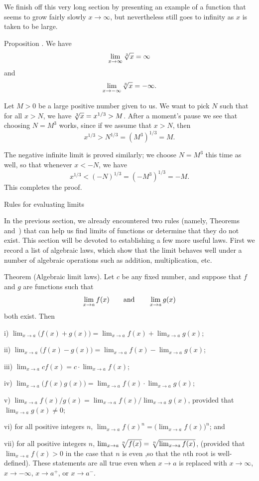 We finish off this very long section by presenting
an example of a function that seems to grow fairly slowly $x\to\infty$, but nevertheless still goes to
infinity as $x$ is taken to be large.

\proclaim Proposition \advthm. We have
$$\lim_{x\to\infty} \root 3\of x = \infty$$
and
$$\lim_{x\to-\infty} \root 3\of x = -\infty.$$

\proof Let $M>0$ be a large positive number given to us.
We want to pick $N$ such that for all $x>N$, we have $\root 3\of x = x^{1/3} > M$.
After a moment's pause we see that choosing $N = M^3$ works, since if we assume that $x>N$, then
$$x^{1/3} > N^{1/3} = (M^3)^{1/3} = M.$$

The negative infinite limit is proved similarly; we choose $N = M^3$ this time as well, so that
whenever $x<-N$, we have
$$x^{1/3} < (-N)^{1/3} = (-M^3)^{1/3} = -M.$$
This completes the proof.\slug

\advsect Rules for evaluating limits

In the previous section, we already encountered two rules (namely, Theorems~{\thmonesidedsame}
and~{\thmonesideddiff}) that can help us find limits of functions
or determine that they do not exist. This section will be devoted to establishing a few more useful laws.
First we record a list of algebraic laws, which show that the limit behaves well under a number of algebraic
operations such as addition, multiplication, etc.

\edef\thmalglaws{\the\thmcount}
\parenproclaim Theorem {\advthm} (Algebraic limit laws).
Let $c$ be any fixed number, and suppose that $f$ and $g$ are functions such that
$$\lim_{x\to a} f(x)\qquad\hbox{and}\qquad \lim_{x\to a} g(x)$$
both exist. Then
\medskip
\item{i)} $\lim_{x\to a} \bigl( f(x) + g(x)\bigr) = \lim_{x\to a} f(x) + \lim_{x\to a} g(x)$;
\smallskip
\item{ii)} $\lim_{x\to a} \bigl( f(x) - g(x)\bigr) = \lim_{x\to a} f(x) - \lim_{x\to a} g(x)$;
\smallskip
\item{iii)} $\lim_{x\to a} cf(x) = c\cdot \lim_{x\to a} f(x)$;
\smallskip
\item{iv)} $\lim_{x\to a} \bigl( f(x)g(x)\bigr) = \lim_{x\to a} f(x) \cdot \lim_{x\to a} g(x)$;
\smallskip
\item{v)} $\lim_{x\to a} f(x)/g(x) = \lim_{x\to a} f(x) \bigl/ \lim_{x\to a} g(x)$, provided
that $\lim_{x\to a} g(x)\ne 0$;
\smallskip
\item{vi)} for all positive integers $n$, $\lim_{x\to a} f(x)^n = \bigl(\lim_{x\to a} f(x)\bigr)^n$; and
\smallskip
\item{vii)} for all positive integers $n$, $\lim_{x\to a} \root n\of{f(x)} = \root n\of{\lim_{x\to a} f(x)}$,
(provided that $\lim_{x\to a} f(x)>0$ in the case that $n$ is even ,so that the $n$th root is well-defined).
\medskip
These statements are all true even when $x\to a$ is replaced with $x\to\infty$, $x\to-\infty$,
$x\to a^+$, or $x\to a^-$.

